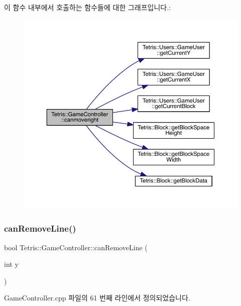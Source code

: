 이 함수 내부에서 호출하는 함수들에 대한 그래프입니다.\+:
\nopagebreak
\begin{figure}[H]
\begin{center}
\leavevmode
\includegraphics[width=350pt]{db/dd2/class_tetris_1_1_game_controller_a6c8189bb893502049396a7de1a73a88c_cgraph}
\end{center}
\end{figure}
\mbox{\label{class_tetris_1_1_game_controller_a912bb473994e869a610ab356086cb0ad}} 
\subsubsection{\texorpdfstring{can\+Remove\+Line()}{canRemoveLine()}\hspace{0.1cm}{\footnotesize\ttfamily [1/2]}}
{\footnotesize\ttfamily bool Tetris\+::\+Game\+Controller\+::can\+Remove\+Line (\begin{DoxyParamCaption}\item[{int}]{y }\end{DoxyParamCaption})}



Game\+Controller.\+cpp 파일의 61 번째 라인에서 정의되었습니다.


